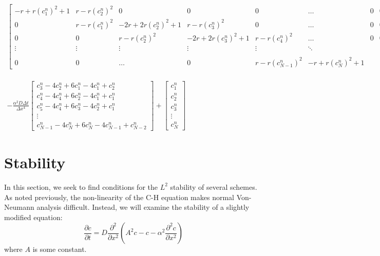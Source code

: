 \documentclass[]{article}
\theoremstyle{definition}
\numberwithin{equation}{section}
\numberwithin{equation}{section}
\begin{document}
	\begin{gather*}
	\begin{bmatrix}
	-r + r(c_1^n)^2+1 & r - r(c_2^n)^2 & 0 & 0 & 0 & \ldots &0& 0\\
	 0 & r-r(c_1^n)^2 & -2r+2r(c_2^n)^2 + 1 & r - r(c_3^n)^2 & 0 & \ldots &0& 0\\
	 0 & 0 & r-r(c_2^n)^2 & -2r+2r(c_3^n)^2+1 & r - r(c_4^n)^2 & \ldots & 0&0\\
	 \vdots & \vdots & \vdots & \vdots & \vdots & \ddots \\ &  \\
	 0 & 0 & \ldots & 0 &   r - r(c_{N-1}^n)^2  & -r + r(c_N^n)^2 +1 
	\end{bmatrix}
	\begin{bmatrix}
	c_{1}^{n+1} \\
	c_{2}^{n+1} \\
	c_{3}^{n+1} \\
	c_{4}^{n+1} \\
	\vdots \\
	c_{N-1}^{n+1}\\
	c_{N}^{n+1}
	\end{bmatrix} = \\
	-\frac{\alpha^2D \Delta t}{\Delta x^4}\begin{bmatrix}
	c_{3}^n -4c_{2}^n + 6c_1^n - 4c_{1}^n + c_{2}^n \\
	c_{4}^n -4c_{4}^n + 6c_2^n - 4c_{1}^n + c_{1}^n \\
	c_{5}^n -4c_{4}^n + 6c_3^n - 4c_{2}^n + c_{1}^n \\
	\vdots \\
	c_{N-1}^n -4c_{N}^n + 6c_N^n - 4c_{N-1}^n + c_{N-2}^n
	\end{bmatrix} + \begin{bmatrix}
	c_1^n \\
	c_2^n \\
	c_3^n \\
	\vdots \\
	c_N^n
	\end{bmatrix}
	\end{gather*}
	\section{Stability}
	In this section, we seek to find conditions for the $L^2$ stability of several schemes. As noted previously, the non-linearity of the C-H equation makes normal Von-Neumann analysis difficult. Instead, we will examine the stability of a slightly modified equation:
	\begin{equation}
			\frac{\partial c}{\partial t}=D \frac{\partial^2 }{\partial x^2} \left(A^2 c - c - \alpha^2 \frac{\partial^2 c}{\partial x^2}\right) \label{eq:s1}
	\end{equation}
	where $A$ is some constant.
\end{document}
